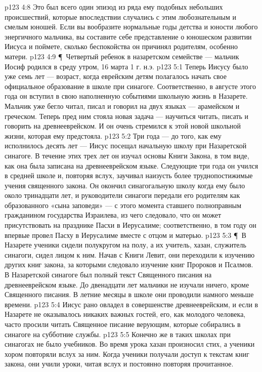 \vs p123 4:8 Это был всего один эпизод из ряда ему подобных небольших происшествий, которые впоследствии случались с этим любознательным и смелым юношей. Если вы вообразите нормальные годы детства и юности любого энергичного мальчика, вы составите себе представление о юношеском развитии Иисуса и поймете, сколько беспокойства он причинял родителям, особенно матери.
\vs p123 4:9 \P\ Четвертый ребенок в назаретском семействе --- мальчик Иосиф родился в среду утром, 16 марта 1 г. н.э.
\vs p123 5:1 Теперь Иисусу было уже семь лет --- возраст, когда еврейским детям полагалось начать свое официальное образование в школе при синагоге. Соответственно, в августе этого года он вступил в свою наполненную событиями школьную жизнь в Назарете. Мальчик уже бегло читал, писал и говорил на двух языках --- арамейском и греческом. Теперь пред ним стояла новая задача --- научиться читать, писать и говорить на древнееврейском. И он очень стремился к этой новой школьной жизни, которая ему предстояла.
\vs p123 5:2 Три года --- до того, как ему исполнилось десять лет --- Иисус посещал начальную школу при Назаретской синагоге. В течение этих трех лет он изучал основы Книги Закона, в том виде, как она была записана на древнееврейском языке. Следующие три года он учился в средней школе и, повторяя вслух, заучивал наизусть более труднопостижимые учения священного закона. Он окончил синагогальную школу когда ему было около тринадцати лет, и руководители синагоги передали его родителям как образованного «сына заповеди» --- с этого момента ставшего полноправным гражданином государства Израилева, из чего следовало, что он может присутствовать на празднике Пасхи в Иерусалиме; соответственно, в том году он впервые провел Пасху в Иерусалиме вместе с отцом и матерью.
\vs p123 5:3 \P\ В Назарете ученики сидели полукругом на полу, а их учитель, хазан, служитель синагоги, сидел лицом к ним. Начав с Книги Левит, они переходили к изучению других книг закона, за которыми следовало изучение книг Пророков и Псалмов. В Назаретской синагоге был полный текст Священного писания на древнееврейском языке. До двенадцати лет мальчики не изучали ничего, кроме Священного писания. В летние месяцы в школе они проводили намного меньше времени.
\vs p123 5:4 Иисус рано овладел в совершенстве древнееврейским, и если в Назарете не оказывалось никаких важных гостей, его, как молодого человека, часто просили читать Священное писание верующим, которые собирались в синагоге на субботние службы.
\vs p123 5:5 Конечно же в таких школах при синагогах не было учебников. Во время урока хазан произносил стих, а ученики хором повторяли вслух за ним. Когда ученики получали доступ к текстам книг закона, они учили уроки, читая вслух и постоянно повторяя прочитанное.

